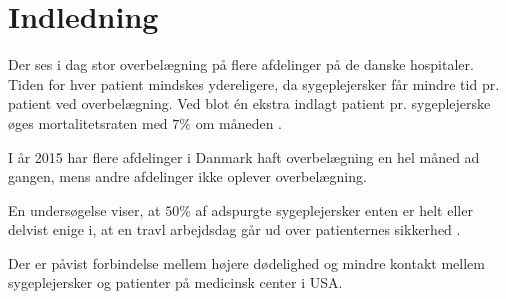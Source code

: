 \chapter{Indledning}
Der ses i dag stor overbelægning på flere afdelinger på de danske hospitaler. Tiden for hver patient mindskes ydereligere, da sygeplejersker får mindre tid pr. patient ved overbelægning.  Ved blot én ekstra indlagt patient pr. sygeplejerske øges mortalitetsraten med $7 \%$ om måneden \cite{Aiken2014}.



I år 2015 har flere afdelinger i Danmark haft overbelægning en hel måned ad gangen, mens andre afdelinger ikke oplever overbelægning.

 
  En undersøgelse viser, at $50 \%$ af adspurgte sygeplejersker enten er helt eller delvist enige i, at en travl arbejdsdag går ud over patienternes sikkerhed \cite{Kjeldsen2015}.



 Der er påvist forbindelse mellem højere dødelighed og mindre kontakt mellem sygeplejersker og patienter på medicinsk center i USA.\cite{Madsen2014}

